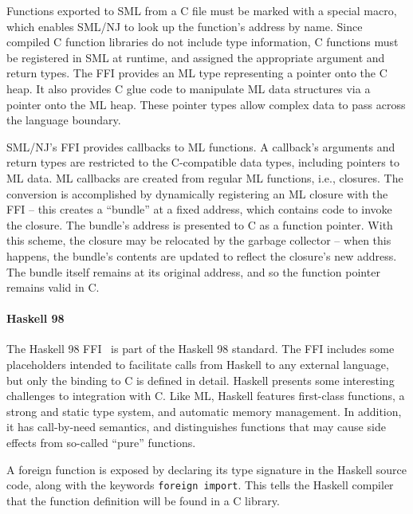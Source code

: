 Functions exported to SML from a C file must be marked with a special macro, which enables SML/NJ to look up the function's address by name. Since compiled C function libraries do not include type information, C functions must be registered in SML at runtime, and assigned the appropriate argument and return types. The FFI provides an ML type representing a pointer onto the C heap. It also provides C glue code to manipulate ML data structures via a pointer onto the ML heap. These pointer types allow complex data to pass across the language boundary.

SML/NJ's FFI provides callbacks to ML functions. A callback's arguments and return types are restricted to the C-compatible data types, including pointers to ML data. ML callbacks are created from regular ML functions, i.e., closures. The conversion is accomplished by dynamically registering an ML closure with the FFI -- this creates a ``bundle'' at a fixed address, which contains code to invoke the closure. The bundle's address is presented to C as a function pointer. With this scheme, the closure may be relocated by the garbage collector -- when this happens, the bundle's contents are updated to reflect the closure's new address. The bundle itself remains at its original address, and so the function pointer remains valid in C.

\paragraph{Haskell 98}

The Haskell 98 FFI~\cite{chakravarty03haskellffi} is part of the Haskell 98 standard. The FFI includes some placeholders intended to facilitate calls from Haskell to any external language, but only the binding to C is defined in detail. Haskell presents some interesting challenges to integration with C. Like ML, Haskell features first-class functions, a strong and static type system, and automatic memory management. In addition, it has call-by-need semantics, and distinguishes functions that may cause side effects from so-called ``pure'' functions.

A foreign function is exposed by declaring its type signature in the Haskell source code, along with the keywords \texttt{foreign import}. This tells the Haskell compiler that the function definition will be found in a C library.

